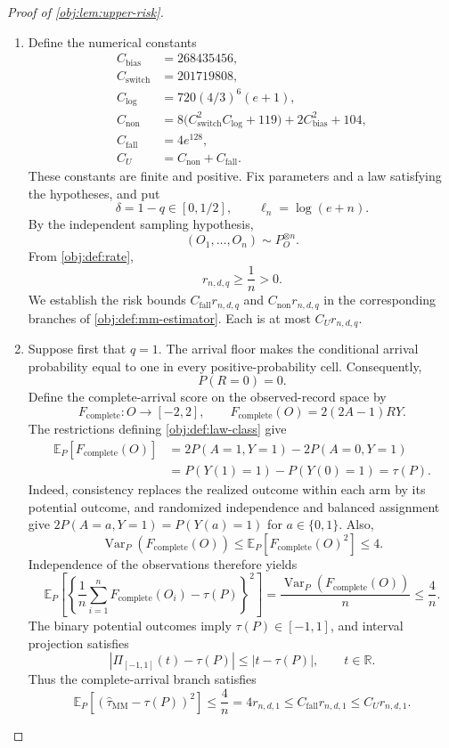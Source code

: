 \begin{proof}[Proof of \cref{obj:lem:upper-risk}]
\begin{enumerate}
\item Define the numerical constants
\[
\begin{aligned}
C_{\mathrm{bias}}&=268435456,\\
C_{\mathrm{switch}}&=201719808,\\
C_{\mathrm{log}}&=720(4/3)^6(e+1),\\
C_{\mathrm{non}}&=
8\bigl(C_{\mathrm{switch}}^2C_{\mathrm{log}}+119\bigr)
+2C_{\mathrm{bias}}^2+104,\\
C_{\mathrm{fall}}&=4e^{128},\\
C_U&=C_{\mathrm{non}}+C_{\mathrm{fall}}.
\end{aligned}
\]
These constants are finite and positive. Fix parameters and a law satisfying the hypotheses, and put
\[
\delta=1-q\in[0,1/2],
\qquad
\ell_n=\log(e+n).
\]
By the independent sampling hypothesis,
\[
(O_1,\ldots,O_n)\sim P_O^{\otimes n}.
\]
From \cref{obj:def:rate},
\[
r_{n,d,q}\ge \frac1n>0.
\]
We establish the risk bounds \(C_{\mathrm{fall}}r_{n,d,q}\) and
\(C_{\mathrm{non}}r_{n,d,q}\) in the corresponding branches of
\cref{obj:def:mm-estimator}. Each is at most \(C_Ur_{n,d,q}\).

\item Suppose first that \(q=1\). The arrival floor makes the conditional arrival probability equal to one in every positive-probability cell. Consequently,
\[
P(R=0)=0.
\]
Define the complete-arrival score on the observed-record space by
\[
F_{\mathrm{complete}}:O\longrightarrow[-2,2],
\qquad
F_{\mathrm{complete}}(O)=2(2A-1)RY.
\]
The restrictions defining \cref{obj:def:law-class} give
\[
\begin{aligned}
\mathbb E_P[F_{\mathrm{complete}}(O)]
&=2P(A=1,Y=1)-2P(A=0,Y=1)\\
&=P(Y(1)=1)-P(Y(0)=1)
=\tau(P).
\end{aligned}
\]
Indeed, consistency replaces the realized outcome within each arm by its potential outcome, and randomized independence and balanced assignment give
\(2P(A=a,Y=1)=P(Y(a)=1)\) for \(a\in\{0,1\}\).
Also,
\[
\operatorname{Var}_P(F_{\mathrm{complete}}(O))
\le \mathbb E_P[F_{\mathrm{complete}}(O)^2]\le4.
\]
Independence of the observations therefore yields
\[
\mathbb E_P\!\left[
\left\{\frac1n\sum_{i=1}^nF_{\mathrm{complete}}(O_i)-\tau(P)\right\}^2
\right]
=\frac{\operatorname{Var}_P(F_{\mathrm{complete}}(O))}{n}
\le\frac4n.
\]
The binary potential outcomes imply \(\tau(P)\in[-1,1]\), and interval projection satisfies
\[
\left|\Pi_{[-1,1]}(t)-\tau(P)\right|
\le |t-\tau(P)|,
\qquad t\in\mathbb R.
\]
Thus the complete-arrival branch satisfies
\[
\mathbb E_P[(\widehat\tau_{\mathrm{MM}}-\tau(P))^2]
\le \frac4n
=4r_{n,d,1}
\le C_{\mathrm{fall}}r_{n,d,1}
\le C_Ur_{n,d,1}.
\]


\end{enumerate}
\end{proof}

